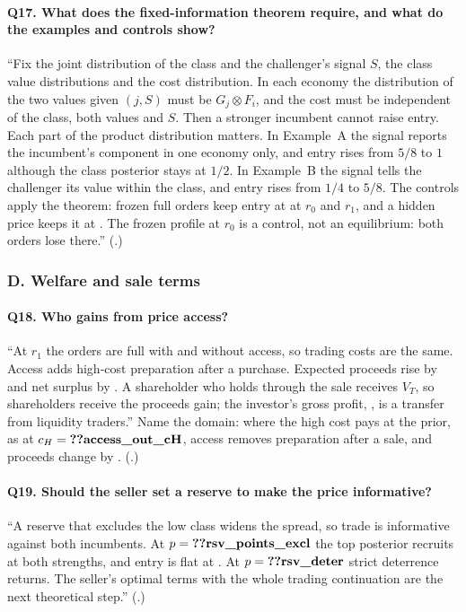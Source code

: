 \paragraph{Q17. What does the fixed-information theorem require, and what do the examples and controls show?}
``Fix the joint distribution of the class and the challenger's signal \(S\), the class value distributions and the cost distribution. In each
economy the distribution of the two values given \((j,S)\) must be \(G_j\otimes F_i\), and the cost must be independent of the
class, both values and \(S\). Then a stronger incumbent cannot raise entry. Each part of the product distribution matters. In
Example~A the signal reports the incumbent's component in one economy only, and entry rises from \(5/8\) to \(1\)
although the class posterior stays at \(1/2\). In Example~B the signal tells the challenger its value within the
class, and entry rises from \(1/4\) to \(5/8\). The controls apply the theorem: frozen full orders keep entry at
 at \(r_0\) and \(r_1\), and a hidden price keeps it at . The frozen
profile at \(r_0\) is a control, not an equilibrium: both orders lose there.''
(.)

\subsubsection*{D. Welfare and sale terms}

\paragraph{Q18. Who gains from price access?}
``At \(r_1\) the orders are full with and without access, so trading costs are the same. Access adds high-cost
preparation after a purchase. Expected proceeds rise by  and net surplus by
. A shareholder who holds through the sale receives \(V_T\), so shareholders receive the
proceeds gain; the investor's gross profit, , is a transfer from liquidity traders.''
Name the domain: where the high cost pays at the prior, as at \(c_H=\reg{access_out_cH}\), access removes
preparation after a sale, and proceeds change by .
(.)

\paragraph{Q19. Should the seller set a reserve to make the price informative?}
``A reserve that excludes the low class widens the spread, so trade is informative against both incumbents. At
\(p=\reg{rsv_points_excl}\) the top posterior recruits at both strengths, and entry is flat at
. At \(p=\reg{rsv_deter}\) strict deterrence returns. The seller's optimal
terms with the whole trading continuation are the next theoretical step.'' (.)

